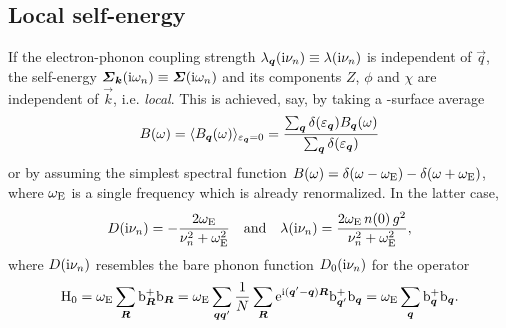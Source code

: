 \subsection{Local self-energy}

If the electron-phonon coupling strength $\lambda_{\boldsymbol q}(\mathrm i \nu_n) \equiv
\lambda(\mathrm i \nu_n)$ is independent of $\vec q$, the self-energy $\boldsymbol
{\varSigma}_{\boldsymbol k}(\mathrm i \omega_n) \equiv \boldsymbol {\varSigma}(\mathrm i \omega_n)$ and its components
$Z$, $\phi$ and $\chi$ are independent of $\vec k$, i.e. \emph{local}. This is
achieved, say, by taking a -surface average \cite[Eqs.~3.23,
3.24]{AllenMitrovic82}
%
\begin{equation*}
    B(\omega) = \langle B_{\boldsymbol q}(\omega)\rangle_{\varepsilon_{\boldsymbol q} = 0}
    = \frac
        {\sum_{\boldsymbol q} \delta(\varepsilon_{\boldsymbol q}) B_{\boldsymbol q}(\omega)}
        {\sum_{\boldsymbol q} \delta(\varepsilon_{\boldsymbol q})}
\end{equation*}
%
or by assuming the simplest spectral function $B(\omega) = \delta(\omega -
\omega \sb{\text{E}}) - \delta(\omega + \omega \sb{\text{E}})$, where $\omega \sb{\text{E}}$ is a
single  frequency which is already renormalized. In the latter
case,
%
\begin{equation*}
    D(\mathrm i \nu_n)
    = -\frac{2 \omega \sb{\text{E}}}{\nu_n^2 + \omega^2 \sb{\text{E}}}
    \quad \text{and} \quad
    \lambda(\mathrm i \nu_n)
    = \frac{2 \omega \sb{\text{E}} \, n(0) \, g^2}{\nu_n^2 + \omega^2 \sb{\text{E}}},
\end{equation*}
%
where $D(\mathrm i \nu_n)$ resembles the bare phonon  function $D_0(\mathrm i
\nu_n)$ for the  operator
%
\begin{equation*}
    \mathrm H_0
    = \omega \sb{\text{E}} \sum_{\boldsymbol R} \mathrm b_{\boldsymbol R}^+ \mathrm b_{\boldsymbol R}
    = \omega \sb{\text{E}} \sum_{\boldsymbol q \boldsymbol q'} \frac 1 N \sum_{\boldsymbol R}
        \mathrm e^{\mathrm i (\boldsymbol q' - \boldsymbol q) \boldsymbol R} \mathrm b_{\boldsymbol q'}^+ \mathrm b_{\boldsymbol q}
    = \omega \sb{\text{E}} \sum_{\boldsymbol q} \mathrm b_{\boldsymbol q}^+ \mathrm b_{\boldsymbol q}.
\end{equation*}

